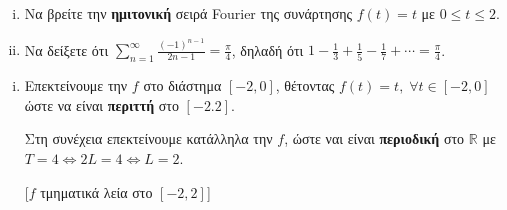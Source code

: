 \documentclass[a4paper,table]{report}
\begin{document}
\begin{mybox3}
  \begin{example}
  \item{}
  \item{}
    \begin{enumerate}[i)]
      \item Να βρείτε την \textbf{ημιτονική} σειρά \textlatin{Fourier} της συνάρτησης 
        $ f(t)=t $ με $ 0 \leq t \leq 2 $.
      \item Να δείξετε ότι $ \sum_{n=1}^{\infty} \frac{(-1)^{n-1}}{2n-1} = 
        \frac{\pi}{4} $, δηλαδή ότι $ 1 - \frac{1}{3} + \frac{1}{5} - \frac{1}{7}
        + \cdots = \frac{\pi}{4} $.
    \end{enumerate}
  \end{example}
\end{mybox3}
\begin{solution}
\item {}
  \begin{enumerate}[i)]
    \item 
      Επεκτείνουμε την $f$ στο διάστημα $ [-2,0] $, θέτοντας $ f(t)=t, \; 
      \forall t \in [-2,0] $ ώστε να είναι \textbf{περιττή} στο $ [-2.2] $.

      Στη συνέχεια επεκτείνουμε κατάλληλα την $f$, ώστε ναι είναι 
      \textbf{περιοδική} στο 
      $ \mathbb{R} $ με $ T=4 \Leftrightarrow 2L=4 \Leftrightarrow \boxed{L=2} $.

      \vspace{\baselineskip}
      \begin{minipage}[t]{0.53\textwidth}
        [$f$ τμηματικά λεία στο $[-2,2]$]
      \end{minipage}


\end{enumerate}
\end{solution}
\end{document}
